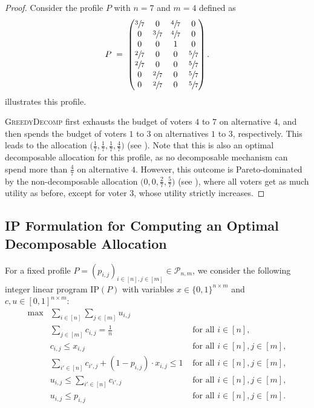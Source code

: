 \documentclass[11pt]{article}
\newcommand{\GrdDec}{\textsc{GreedyDecomp} }
\begin{document}
\begin{proof}
    Consider the profile $P$ with $n = 7$ and $m = 4$ defined as 
    \[
    P \;=\;
    \begin{pmatrix}
    \sfrac{3}{7} & 0 & \sfrac{4}{7} & 0\\
    0 & \sfrac{3}{7} & \sfrac{4}{7} & 0\\
    0 & 0 & 1 & 0\\
    \sfrac{2}{7} & 0 & 0 & \sfrac{5}{7}\\
    \sfrac{2}{7} & 0 & 0 & \sfrac{5}{7}\\
    0 & \sfrac{2}{7} & 0 & \sfrac{5}{7}\\
    0 & \sfrac{2}{7} & 0 & \sfrac{5}{7}\\
    \end{pmatrix}.
    \]  illustrates this profile.
    
    \GrdDec first exhausts the budget of voters $4$ to $7$ on alternative 4, and then spends the budget of voters $1$ to $3$ on alternatives $1$ to $3$, respectively. This leads to the allocation $\big(\frac{1}{7}, \frac{1}{7}, \frac{1}{7}, \frac{4}{7}\big)$ (see ). Note that this is also an
    optimal decomposable allocation for this profile, as no decomposable mechanism can spend more than $\frac{4}{7}$ on alternative $4$.
    However, this outcome is Pareto-dominated by the non-decomposable allocation $\big(0, 0, \frac{2}{7}, \frac{5}{7}\big)$ (see ), where all voters get as much utility as before, except for voter $3$, whose utility strictly increases. 
\end{proof}

\subsection{IP Formulation for Computing an Optimal Decomposable Allocation}\label{app:IPDecomp}

For a fixed profile $P=(p_{i,j})_{i\in [n],j\in [m]}\in \mathcal{P}_{n,m}$, we consider the following integer linear program $\mathrm{IP}(P)$ with variables $x\in \{0,1\}^{n\times m}$ and $c,u\in [0,1]^{n\times m}$: %
\begin{align}
    \max &\sum_{i \in [n]} \sum_{j \in [m]} u_{i,j} \nonumber\\ 
    &\sum_{j \in [m]} c_{i,j} = \frac{1}{n} & \text{ for all } i \in [n],\label{eq:ilp-decomp-1}\\ 
    & c_{i,j} \leq x_{i,j} & \text{ for all } i \in [n], j \in [m],\label{eq:ilp-decomp-2}\\ 
    &\sum_{i' \in [n]} c_{i',j} + (1-p_{i,j}) \cdot x_{i,j} \leq 1 & \text{ for all } i \in [n], j \in [m],\label{eq:ilp-decomp-3}\\ 
    & u_{i,j} \leq \sum_{i' \in [n]} c_{i',j} &\text{ for all } i \in [n], j \in [m],\label{eq:ilp-decomp-4}\\ 
    & u_{i,j} \leq p_{i,j} &\text{ for all } i \in [n], j \in [m].\label{eq:ilp-decomp-5}%
\end{align}
\end{document}
